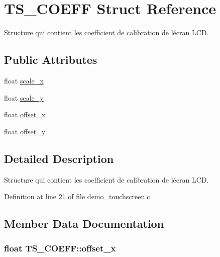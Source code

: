 \hypertarget{struct_t_s___c_o_e_f_f}{}\section{T\+S\+\_\+\+C\+O\+E\+F\+F Struct Reference}
\label{struct_t_s___c_o_e_f_f}


Structure qui contient les coefficient de calibration de l\textquotesingle{}écran L\+C\+D.  


\subsection*{Public Attributes}
\begin{DoxyCompactItemize}
\item 
float \hyperlink{struct_t_s___c_o_e_f_f_ab628a15e6f11ae3458a61b34e4fb073a}{scale\+\_\+x}
\item 
float \hyperlink{struct_t_s___c_o_e_f_f_aaaa411fa3ff9762afb033922e4b8417c}{scale\+\_\+y}
\item 
float \hyperlink{struct_t_s___c_o_e_f_f_a559363404fe667ecb2e9abe2a7484d65}{offset\+\_\+x}
\item 
float \hyperlink{struct_t_s___c_o_e_f_f_a81877de42fb3b63758119c416958dcfe}{offset\+\_\+y}
\end{DoxyCompactItemize}


\subsection{Detailed Description}
Structure qui contient les coefficient de calibration de l\textquotesingle{}écran L\+C\+D. 

Definition at line 21 of file demo\+\_\+touchscreen.\+c.



\subsection{Member Data Documentation}
\hypertarget{struct_t_s___c_o_e_f_f_a559363404fe667ecb2e9abe2a7484d65}{}
\subsubsection[{offset\+\_\+x}]{\setlength{\rightskip}{0pt plus 5cm}float T\+S\+\_\+\+C\+O\+E\+F\+F\+::offset\+\_\+x}\label{struct_t_s___c_o_e_f_f_a559363404fe667ecb2e9abe2a7484d65}


